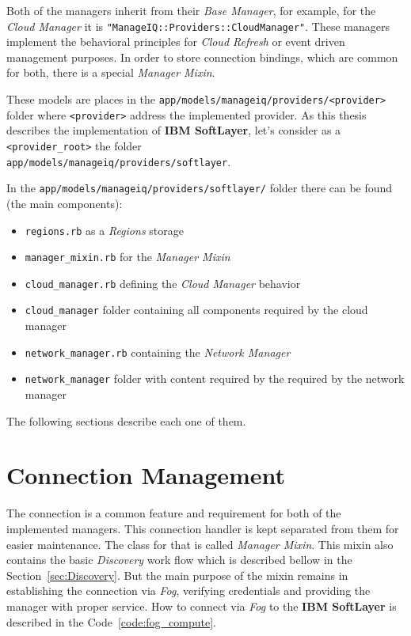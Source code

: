 Both of the managers inherit from their \emph{Base Manager}, for example, for the \emph{Cloud Manager} it is \verb|"ManageIQ::Providers::CloudManager"|. These managers implement the behavioral principles for \emph{Cloud Refresh} or event driven management purposes. In order to store connection bindings, which are common for both, there is a special \emph{Manager Mixin}.

These models are places in the \verb|app/models/manageiq/providers/<provider>| folder where \verb|<provider>| address the implemented provider. As this thesis describes the implementation of \textbf{IBM SoftLayer}, let's consider as a \verb|<provider_root>| the folder\\ \verb|app/models/manageiq/providers/softlayer|.

In the \verb|app/models/manageiq/providers/softlayer/| folder there can be found (the main components):

\begin{itemize}
	\item \verb|regions.rb| as a \emph{Regions} storage
	\item \verb|manager_mixin.rb| for the \emph{Manager Mixin}
	\item \verb|cloud_manager.rb| defining the \emph{Cloud Manager} behavior
	\item \verb|cloud_manager| folder containing all components required by the cloud manager
	\item \verb|network_manager.rb| containing the \emph{Network Manager}
	\item \verb|network_manager| folder with content required by the required by the network manager
\end{itemize}

The following sections describe each one of them.

\section{Connection Management}
\label{sec:Connection Management}

The connection is a common feature and requirement for both of the implemented managers. This connection handler is kept separated from them for easier maintenance. The class for that is called \emph{Manager Mixin}. This mixin also contains the basic \emph{Discovery} work flow which is described bellow in the Section~\ref{sec:Discovery}. But the main purpose of the mixin remains in establishing the connection via \emph{Fog}, verifying credentials and providing the manager with proper service. How to connect via \emph{Fog} to the \textbf{IBM SoftLayer} is described in the Code~\ref{code:fog_compute}.

